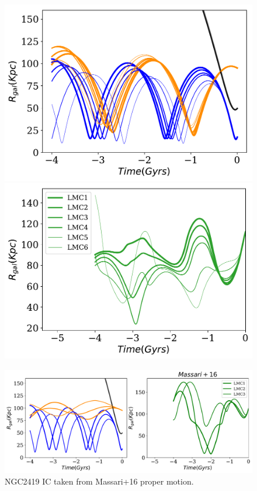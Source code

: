 \documentclass[14pt]{article}
\begin{document}
\begin{figure}[H]
\centering
\begin{minipage}{0.49\linewidth}
\includegraphics[scale=0.5]{../exploratory_code/gal_orbits_all_LMCs.pdf}
\end{minipage}
\begin{minipage}{0.45\linewidth}
\includegraphics[scale=0.5]{../exploratory_code/d_rel_all_LMCs.pdf}
\end{minipage}
\end{figure}




\begin{figure}[H]
\centering
\includegraphics[scale=0.5]{../exploratory_code/gal_orbits_all_LMCs_massari.pdf}
\caption{NGC2419 IC taken from Massari+16 proper motion.}
\end{figure}
\end{document}
